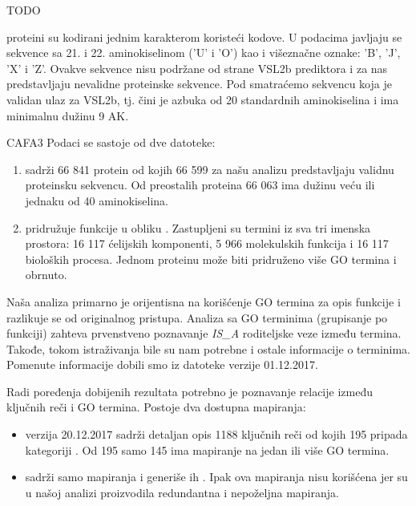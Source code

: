 TODO


\swissprot proteini su kodirani jednim karakterom koristeći 
kodove.  U podacima javljaju se sekvence sa  21. i 22. aminokiselinom ('U' i 'O')
kao i  višeznačne oznake: 'B', 'J', 'X' i 'Z'.  Ovakve sekvence nisu podržane od
strane VSL2b prediktora i za nas predstavljaju nevalidne proteinske sekvence. Pod
 smatraćemo sekvencu koja je validan
ulaz za VSL2b, tj. čini je azbuka od 20 standardnih aminokiselina i
ima minimalnu dužinu 9 AK.

CAFA3 Podaci se sastoje od dve datoteke:
\begin{enumerate}
  \item {}  sadrži 66 841 protein od kojih 66 599
    za našu analizu predstavljaju validnu proteinsku sekvencu. Od preostalih
    proteina 66 063 ima dužinu veću ili jednaku od 40 aminokiselina.
  \item {} pridružuje funkcije u obliku 
    . Zastupljeni su termini iz sva tri imenska prostora:
    16 117 ćelijskih komponenti, 5 966 molekulskih funkcija i 16 117 bioloških
    procesa. Jednom proteinu može biti pridruženo više GO termina i obrnuto.
\end{enumerate}

Naša analiza primarno je orijentisna na korišćenje GO termina za opis funkcije
i razlikuje se od originalnog pristupa.  Analiza sa GO terminima (grupisanje po
funkciji) zahteva prvenstveno poznavanje \textit{IS\_A} roditeljske veze između
termina. Takođe, tokom istraživanja bile su nam potrebne i ostale informacije o
terminima. Pomenute informacije dobili smo iz datoteke \cite{go_obo}
verzije 01.12.2017.

Radi poređenja dobijenih rezultata potrebno je poznavanje relacije između
ključnih reči i GO termina. Postoje dva dostupna mapiranja:
\begin{itemize}
  \item {}\cite{keywlist_txt} verzija 20.12.2017 sadrži
    detaljan opis 1188 ključnih reči od kojih 195 pripada kategoriji
    .  Od 195 samo 145 ima mapiranje na jedan ili
    više GO termina.
  \item {}\cite{uniprotkb_kw2go} sadrži samo
    mapiranja i generiše ih \parencite{Barrell2009}.
    Ipak ova mapiranja nisu korišćena jer su u našoj analizi proizvodila
    redundantna i nepoželjna mapiranja.
\end{itemize}

